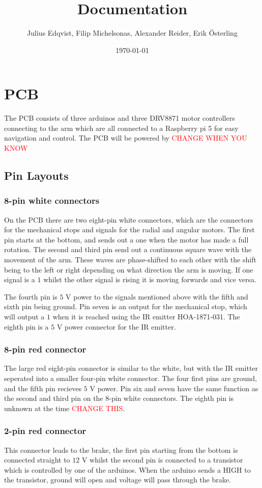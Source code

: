 \documentclass{article}
\title{Documentation}
\author{Julius Edqvist, Filip Michelsonas, Alexander Reider, Erik Österling}
\date{\today}
\begin{document}
\maketitle

\section{PCB}
The PCB consists of three arduinos and three DRV8871 motor controllers connecting to the arm which are all connected to a Raspberry pi 5 for easy navigation and control. The PCB will be powered by \textcolor{red}{CHANGE WHEN YOU KNOW}
\subsection{Pin Layouts}
\subsubsection{8-pin white connectors}
On the PCB there are two eight-pin white connectors, which are the connectors for the mechanical stops and signals for the radial and angular motors. The first pin starts at the bottom, and sends out a one when the motor has made a full rotation. The second and third pin send out a continuous square wave with the movement of the arm. These waves are phase-shifted to each other with the shift being to the left or right depending on what direction the arm is moving. If one signal is a $1$ whilst the other signal is rising it is moving forwards and vice versa. 

The fourth pin is $5$ V power to the signals mentioned above with the fifth and sixth pin being ground. Pin seven is an output for the mechanical stop, which will output a $1$ when it is reached using the IR emitter HOA-1871-031. The eighth pin is a $5$ V power connector for the IR emitter. 

\subsubsection{8-pin red connector}
The large red eight-pin connector is similar to the white, but with the IR emitter seperated into a smaller four-pin white connector. The four first pins are ground, and the fifth pin recieves $5$ V power. Pin six and seven have the same function as the second and third pin on the 8-pin white connectors. The eighth pin is unknown at the time \textcolor{red}{CHANGE THIS}. 

\subsubsection{2-pin red connector}
This connector leads to the brake, the first pin starting from the bottom is connected straight to $12$ V whilst the second pin is connected to a transistor which is controlled by one of the arduinos. When the arduino sends a HIGH to the transistor, ground will open and voltage will pass through the brake. 
\end{document}
